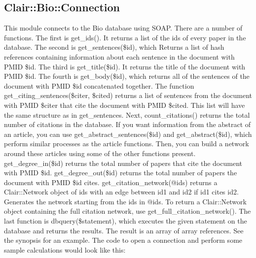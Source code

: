 \subsection{Clair::Bio::Connection}

This module connects to the Bio database using SOAP.  There are a number of functions.  
The first is get\_ids().  It returns a list of the ids of every paper in the database.  
The second is get\_sentences(\$id), which Returns a list of hash references containing information about each sentence in the document with PMID \$id.   
The third is get\_title(\$id).  It returns the title of the document with PMID \$id.  The fourth is get\_body(\$id), which returns all of the sentences of the document with PMID \$id concatenated together.
The function get\_citing\_sentences(\$citer, \$cited) returns a list of sentences from the document with PMID \$citer that cite the document with PMID \$cited. This list will have the same structure as in get\_sentences.
Next, count\_citations() returns the total number of citations in the database.
If you want information from the abstract of an article, you can use get\_abstract\_sentences(\$id) and get\_abstract(\$id), which perform similar processes as the article functions.
Then, you can build a network around these articles using some of the other functions present.  {g}et\_degree\_in(\$id) returns the total number of papers that cite the document with PMID \$id.  {g}et\_degree\_out(\$id) returns the total number of papers the document with PMID \$id cites.  {g}et\_citation\_network(@ids) returns a Clair::Network object of ids with an edge between id1 and id2 if id1 cites id2. Generates the network starting from the ids in @ids.
To return a Clair::Network object containing the full citation network, use get\_full\_citation\_network().
The last function is dbquery(\$statement), which executes the given statement on the database and returns the results. The result is an array of array references. See the synopsis for an example.
The code to open a connection and perform some sample calculations would look like this:
\\
\\

